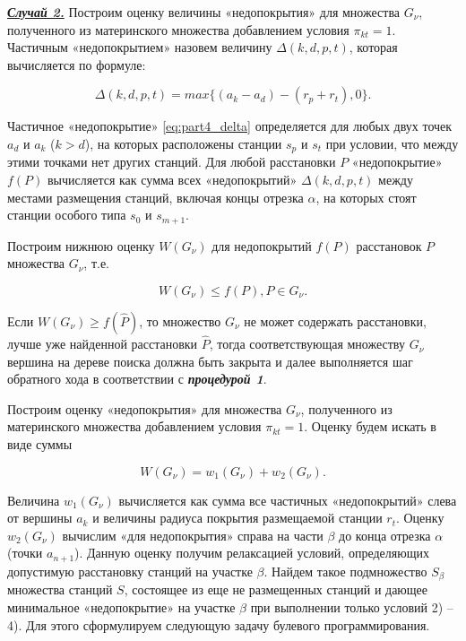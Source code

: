 \underline{\textit{\textbf{Случай 2.}}}
Построим оценку величины «недопокрытия» для множества $G_\nu$, полученного из материнского множества добавлением условия $\pi_{kt}=1$. Частичным «недопокрытием» назовем величину $\Delta(k,d,p,t)$, которая вычисляется по формуле:

\begin{equation}\label{eq:part4_delta}
\Delta(k,d,p,t) = max\{\left(a_{k} - a_{d} \right) - \left(r_{p} + r_{t} \right), 0\}.
\end{equation}

Частичное «недопокрытие» \cref{eq:part4_delta} определяется для любых двух точек $a_d$ и $a_k$ ($k>d$), на которых расположены станции $s_p$ и $s_t$ при условии, что между этими точками нет других станций. Для любой расстановки $P$ «недопокрытие» $f(P)$ вычисляется как сумма всех «недопокрытий» $\Delta(k,d,p,t)$ между местами размещения станций, включая концы отрезка $\alpha$, на которых стоят станции особого типа $s_0$ и $s_{m+1}$.

Построим нижнюю оценку $W(G_{\nu} )$ для недопокрытий $f(P)$ расстановок $P$ множества $G_\nu$, т.е. 

\begin{displaymath}
W(G_\nu) \leq f(P), P \in G_\nu. 
\end{displaymath}

Если $W(G_\nu) \geq f(\widehat{P})$, то множество $G_\nu$ не может содержать расстановки, лучше уже найденной расстановки $\widehat{P}$, тогда соответствующая множеству $G_\nu$  вершина на дереве поиска должна быть закрыта и далее выполняется шаг обратного хода в соответствии с  \textit{\textbf{процедурой 1}}. 

Построим оценку «недопокрытия» для множества $G_\nu$, полученного из материнского множества добавлением условия $\pi_{kt}=1$. Оценку будем искать в виде суммы

\begin{equation}
  \label{eq:part4_noncoverage_estimation}
  W\left(G_\nu\right) = w_1 \left(G_\nu \right) + w_2 \left(G_\nu \right). 
\end{equation}

Величина $w_1 \left(G_\nu \right)$ вычисляется как сумма все частичных «недопокрытий» слева от вершины $a_k$ и величины радиуса покрытия размещаемой станции $r_t$. Оценку $w_2 \left(G_\nu \right)$ вычислим «для недопокрытия» справа на части $\beta$ до конца отрезка $\alpha$ (точки $a_{n+1}$). Данную оценку получим релаксацией условий, определяющих допустимую расстановку станций на участке $\beta$. Найдем такое подмножество $S_\beta$ множества станций $S$, состоящее из еще не размещенных станций и дающее минимальное «недопокрытие» на участке $\beta$ при выполнении только условий 2) – 4). Для этого сформулируем следующую задачу булевого программирования.

